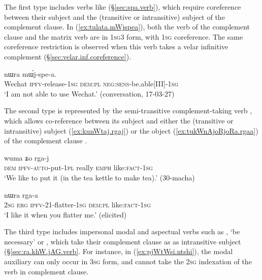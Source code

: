 The first type includes verbs like  (§\ref{sec:spa.verb}), which require coreference between their subject and the (transitive or intransitive) subject of the complement clause. In (\ref{ex:tulata.mWjspea}), both the verb of the complement clause and the matrix verb are in \textsc{1sg}\fl{}3 form, with \textsc{1sg} coreference. The same coreference restriction is observed when this verb takes a velar infinitive complement (§\ref{sec:velar.inf.coreference}).
 
\begin{exe}
\ex \label{ex:tulata.mWjspea}
  nɯra mɯ́j-spe-a. \\
 Wechat \textsc{ipfv}-release-\textsc{1sg} \textsc{dem}:\textsc{pl} \textsc{neg}:\textsc{sens}-be.able[III]-\textsc{1sg} \\
 \glt `I am not able to use Wechat.' (conversation, 17-03-27)
  \end{exe}
 
The second type is represented by the semi-transitive com\-ple\-ment-taking verb , which allows co-reference between its subject and either the (transitive or intransitive) subject (\ref{ex:kunWtaj.rgaj}) or the object (\ref{ex:tukWnAjoRjoRa.rgaa}) of the complement clause \citep[238]{jacques16complementation}. 
   
\begin{exe}
\ex \label{ex:kunWtaj.rgaj}
 \gll [nɯ ku-nɯ-ta-j] wuma ʑo rga-j   \\
 \textsc{dem} \textsc{ipfv}-\textsc{auto}-put-\textsc{1pl} really \textsc{emph} like:\textsc{fact}-\textsc{1sg} \\
 \glt `We like to put it (in the tea kettle to make tea).' (30-macha)
\end{exe}
     
 \begin{exe}
\ex \label{ex:tukWnAjoRjoRa.rgaa}
  nɯra rga-a \\
 \textsc{2sg} \textsc{erg} \textsc{ipfv}-2\fl{}1-flatter-\textsc{1sg} \textsc{dem}:\textsc{pl}  like:\textsc{fact}-\textsc{1sg}\\
\glt `I like it when you flatter me.' (elicited)
 \end{exe}
 
 The third type includes impersonal modal and aspectual verbs such as , `be necessary' or , which take their complement clause as as intransitive subject (§\ref{sec:ra.khW.jAG.verb}. For instance, in (\ref{ex:pjWtWsi.ntshi}), the modal auxiliary  can only occur in \textsc{3sg} form, and cannot take the \textsc{2sg} indexation of the verb in complement clause.
 
